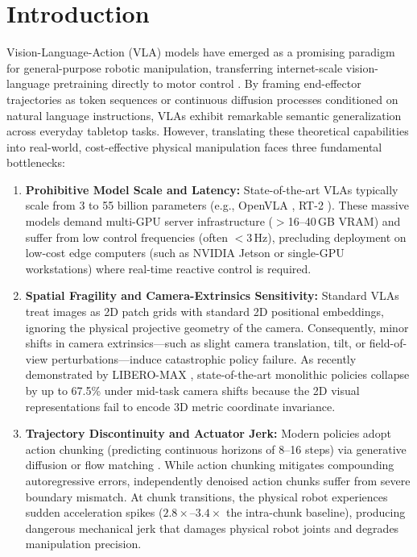 \section{Introduction}
\label{sec:introduction}

Vision-Language-Action (VLA) models have emerged as a promising paradigm for general-purpose robotic manipulation, transferring internet-scale vision-language pretraining directly to motor control \cite{open_x_embodiment_rt_x_2023,kim2024openvla,black2024pi_0,octo2023}. By framing end-effector trajectories as token sequences or continuous diffusion processes conditioned on natural language instructions, VLAs exhibit remarkable semantic generalization across everyday tabletop tasks. However, translating these theoretical capabilities into real-world, cost-effective physical manipulation faces three fundamental bottlenecks:

\begin{enumerate}
    \item \textbf{Prohibitive Model Scale and Latency:} State-of-the-art VLAs typically scale from 3 to 55 billion parameters (e.g., OpenVLA \cite{kim2024openvla}, RT-2 \cite{open_x_embodiment_rt_x_2023}). These massive models demand multi-GPU server infrastructure ($>$16--40\,GB VRAM) and suffer from low control frequencies (often $<$3\,Hz), precluding deployment on low-cost edge computers (such as NVIDIA Jetson or single-GPU workstations) where real-time reactive control is required.
    
    \item \textbf{Spatial Fragility and Camera-Extrinsics Sensitivity:} Standard VLAs treat images as 2D patch grids with standard 2D positional embeddings, ignoring the physical projective geometry of the camera. Consequently, minor shifts in camera extrinsics—such as slight camera translation, tilt, or field-of-view perturbations—induce catastrophic policy failure. As recently demonstrated by LIBERO-MAX \cite{liberomax2024}, state-of-the-art monolithic policies collapse by up to 67.5\% under mid-task camera shifts because the 2D visual representations fail to encode 3D metric coordinate invariance.
    
    \item \textbf{Trajectory Discontinuity and Actuator Jerk:} Modern policies adopt action chunking (predicting continuous horizons of 8--16 steps) via generative diffusion or flow matching \cite{zhao2023act,chi2023diffusion,peebles2023scalable}. While action chunking mitigates compounding autoregressive errors, independently denoised action chunks suffer from severe boundary mismatch. At chunk transitions, the physical robot experiences sudden acceleration spikes ($2.8\times$--$3.4\times$ the intra-chunk baseline), producing dangerous mechanical jerk that damages physical robot joints and degrades manipulation precision.
\end{enumerate}

